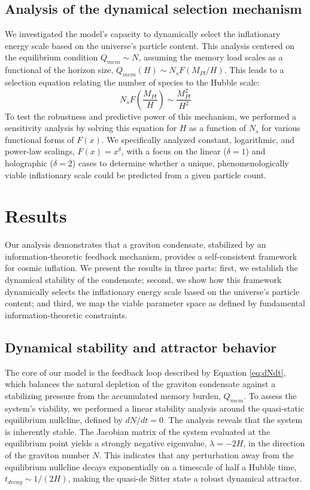 \documentclass[]{article}
\begin{document}
\subsection{Analysis of the dynamical selection mechanism}
We investigated the model's capacity to dynamically select the inflationary energy scale based on the universe's particle content. This analysis centered on the equilibrium condition $Q_{mem} \sim N$, assuming the memory load scales as a functional of the horizon size, $Q_{mem}(H) \sim N_s F(M_{Pl}/H)$. This leads to a selection equation relating the number of species to the Hubble scale:
\begin{equation}
N_s F\left(\frac{M_{Pl}}{H}\right) \sim \frac{M_{Pl}^2}{H^2}
\label{eq:selection}
\end{equation}
To test the robustness and predictive power of this mechanism, we performed a sensitivity analysis by solving this equation for $H$ as a function of $N_s$ for various functional forms of $F(x)$. We specifically analyzed constant, logarithmic, and power-law scalings, $F(x) = x^\delta$, with a focus on the linear ($\delta=1$) and holographic ($\delta=2$) cases to determine whether a unique, phenomenologically viable inflationary scale could be predicted from a given particle count.

\section{Results}
\label{sec:results}
Our analysis demonstrates that a graviton condensate, stabilized by an information-theoretic feedback mechanism, provides a self-consistent framework for cosmic inflation. We present the results in three parts: first, we establish the dynamical stability of the condensate; second, we show how this framework dynamically selects the inflationary energy scale based on the universe's particle content; and third, we map the viable parameter space as defined by fundamental information-theoretic constraints.

\subsection{Dynamical stability and attractor behavior}
The core of our model is the feedback loop described by Equation \ref{eq:dNdt}, which balances the natural depletion of the graviton condensate against a stabilizing pressure from the accumulated memory burden, $Q_{mem}$. To assess the system's viability, we performed a linear stability analysis around the quasi-static equilibrium nullcline, defined by $dN/dt = 0$. The analysis reveals that the system is inherently stable. The Jacobian matrix of the system evaluated at the equilibrium point yields a strongly negative eigenvalue, $\lambda = -2H$, in the direction of the graviton number $N$. This indicates that any perturbation away from the equilibrium nullcline decays exponentially on a timescale of half a Hubble time, $t_{decay} \sim 1/(2H)$, making the quasi-de Sitter state a robust dynamical attractor.
\end{document}
